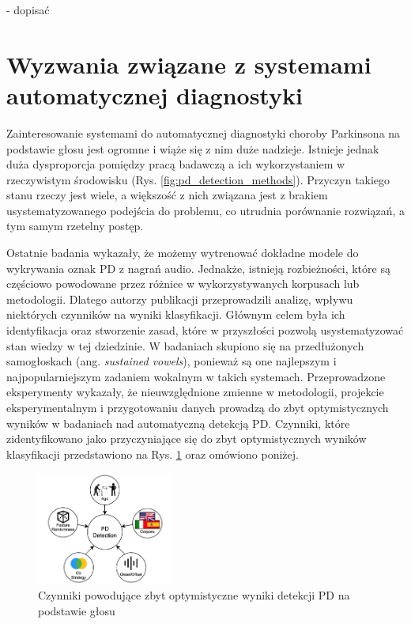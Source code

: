 \cite{Wodzinski} \cite{KARAMAN2021115013} \cite{app11073043} \cite{bioengineering10050531}- dopisać

\section{Wyzwania związane z systemami automatycznej diagnostyki}\label{sec:wyzwania}

Zainteresowanie systemami do automatycznej diagnostyki choroby Parkinsona na podstawie głosu jest ogromne i wiąże się z nim duże nadzieje.
Istnieje jednak duża dysproporcja pomiędzy pracą badawczą a ich wykorzystaniem w rzeczywistym środowisku (Rys. \ref{fig:pd_detection_methods}).
Przyczyn takiego stanu rzeczy jest wiele, a większość z nich związana jest z brakiem usystematyzowanego podejścia do problemu, co utrudnia porównanie
rozwiązań, a tym samym rzetelny postęp.

Ostatnie badania wykazały, że możemy wytrenować dokładne modele do wykrywania oznak PD z nagrań audio.
Jednakże, istnieją rozbieżności, które są częściowo powodowane przez różnice w
wykorzystywanych korpusach lub metodologii.
Dlatego autorzy publikacji \cite{SustainedVowelsProblems} przeprowadzili analizę, wpływu niektórych czynników na wyniki klasyfikacji.
Głównym celem była ich identyfikacja oraz stworzenie zasad, które w przyszłości pozwolą usystematyzować stan wiedzy w tej dziedzinie.
W badaniach skupiono się na przedłużonych samogłoskach (ang. \emph{sustained vowels}), ponieważ są one najlepszym i najpopularniejszym zadaniem
wokalnym w takich systemach.
Przeprowadzone eksperymenty wykazały, że nieuwzględnione zmienne w metodologii, projekcie eksperymentalnym i
przygotowaniu danych prowadzą do zbyt optymistycznych wyników w badaniach nad automatyczną detekcją PD.
Czynniki, które zidentyfikowano jako przyczyniające się do zbyt optymistycznych wyników klasyfikacji
przedstawiono na Rys. \ref{fig:factors_PD_detection} oraz omówiono poniżej.


\begin{figure}[htbp]
	\centering
	\includegraphics[width=0.4\textwidth]{./img/influence_of_factors_on_PD_detection}
	\caption{Czynniki powodujące zbyt optymistyczne wyniki detekcji PD na podstawie głosu \cite{SustainedVowelsProblems}}
    \label{fig:factors_PD_detection}
\end{figure}


